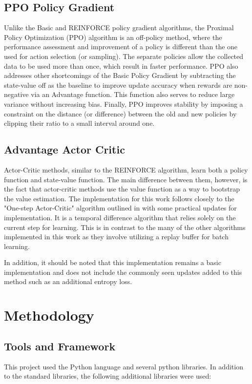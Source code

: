 \documentclass[conference]{IEEEtran}
\begin{document}
\subsection{PPO Policy Gradient}
Unlike the Basic and REINFORCE policy gradient algorithms, the Proximal Policy Optimization (PPO) algorithm is an off-policy method, where the performance assessment and improvement of a policy is different than the one used for action selection (or sampling). The separate policies allow the collected data to be used more than once, which result in faster performance. PPO also addresses other shortcomings of the Basic Policy Gradient by subtracting the state-value off as the baseline to improve update accuracy when rewards are non-negative via an Advantage function. This function also serves to reduce large variance without increasing bias. Finally, PPO improves stability by imposing a constraint on the distance (or difference) between the old and new policies by clipping their ratio to a small interval around one.

\subsection{Advantage Actor Critic}
Actor-Critic methods, similar to the REINFORCE algorithm, learn both a policy function and state-value function.
The main difference between them, however, is the fact that actor-critic methods use the value function as a way to bootstrap the value estimation.
The implementation for this work follows closely to the "One-step Actor-Critic" algorithm outlined in \cite{ReinforcementLearningBook} with some practical updates for implementation.
It is a temporal difference algorithm that relies solely on the current step for learning.
This is in contrast to the many of the other algorithms implemented in this work as they involve utilizing a replay buffer for batch learning.

In addition, it should be noted that this implementation remains a basic implementation and does not include the commonly seen updates added to this method such as an additional entropy loss.

\section{Methodology} \label{methodology}

\subsection{Tools and Framework}
This project used the Python language and several python libraries. 
In addition to the standard libraries, the following additional libraries were used:
 
\end{document}
